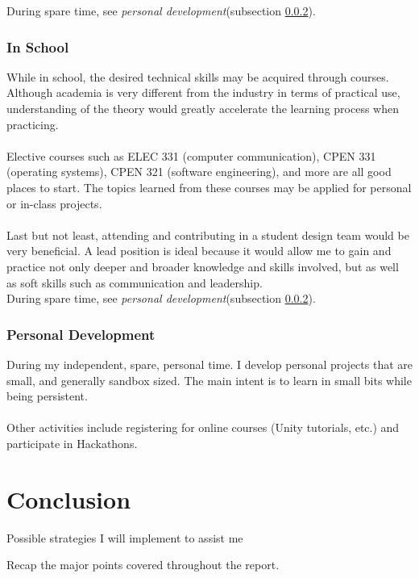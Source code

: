 \documentclass[10pt,letterpaper]{article}
\begin{document}
During spare time, see \textit{personal development}(subsection \ref{personal-development}).\\

\subsubsection{In School}
While in school, the desired technical skills may be acquired through courses. Although academia is very different from the industry in terms of practical use, understanding of the theory would greatly accelerate the learning process when practicing.\\
\\
Elective courses such as ELEC 331 (computer communication), CPEN 331 (operating systems), CPEN 321 (software engineering), and more are all good places to start. The topics learned from these courses may be applied for personal or in-class projects.\\
\\
Last but not least, attending and contributing in a student design team would be very beneficial. A lead position is ideal because it would allow me to gain and practice not only deeper and broader knowledge and skills involved, but as well as soft skills such as communication and leadership.\\

During spare time, see \textit{personal development}(subsection \ref{personal-development}).\\

\subsubsection{Personal Development}\label{personal-development}
During my independent, spare, personal time. I develop personal projects that are small, and generally sandbox sized. The main intent is to learn in small bits while being persistent.\\
\\
Other activities include registering for online courses (Unity tutorials, etc.) and participate in Hackathons.\\

\clearpage
{}
\section*{Conclusion}\label{conclusion}

Possible strategies I will implement to assist me 

Recap the major points covered throughout the report.\\

\clearpage
{}


\end{document}
